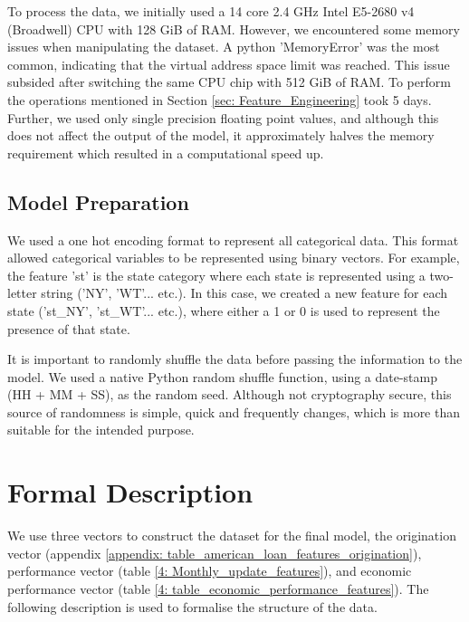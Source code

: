             To process the data, we initially used a 14 core 2.4 GHz Intel E5-2680 v4 (Broadwell) CPU with 128 GiB of RAM. However, we encountered some memory issues when manipulating the dataset. A python 'MemoryError' was the most common, indicating that the virtual address space limit was reached. This issue subsided after switching the same CPU chip with 512 GiB of RAM. To perform the operations mentioned in Section \ref{sec: Feature_Engineering} took 5 days. Further, we used only single precision floating point values, and although this does not affect the output of the model, it approximately halves the memory requirement which resulted in a computational speed up.
            
        
        \subsection{Model Preparation}
            We used a one hot encoding format to represent all categorical data. This format allowed categorical variables to be represented using binary vectors. For example, the feature 'st' is the state category where each state is represented using a two-letter string ('NY', 'WT'... etc.). In this case, we created a new feature for each state ('st\_NY', 'st\_WT'... etc.), where either a 1 or 0 is used to represent the presence of that state. 
            
            It is important to randomly shuffle the data before passing the information to the model. We used a native Python random shuffle function, using a date-stamp (HH + MM + SS), as the random seed. Although not cryptography secure, this source of randomness is simple, quick and frequently changes, which is more than suitable for the intended purpose.
            

    \clearpage

    \section{Formal Description} \label{formal_description}
        We use three vectors to construct the dataset for the final model, the origination vector (appendix \ref{appendix: table_american_loan_features_origination}), performance vector (table \ref{4: Monthly_update_features}), and economic performance vector (table \ref{4: table_economic_performance_features}). The following description is used to formalise the structure of the data.
        
        \vspace{0.5cm}
        
